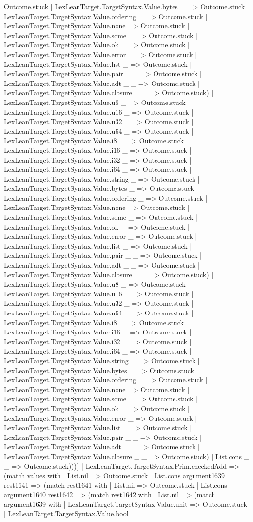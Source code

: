 \documentclass[11pt]{article}
\begin{document}
Outcome.stuck | LexLeanTarget.TargetSyntax.Value.bytes \_ => Outcome.stuck | LexLeanTarget.TargetSyntax.Value.ordering \_ => Outcome.stuck | LexLeanTarget.TargetSyntax.Value.none => Outcome.stuck | LexLeanTarget.TargetSyntax.Value.some \_ => Outcome.stuck | LexLeanTarget.TargetSyntax.Value.ok \_ => Outcome.stuck | LexLeanTarget.TargetSyntax.Value.error \_ => Outcome.stuck | LexLeanTarget.TargetSyntax.Value.list \_ => Outcome.stuck | LexLeanTarget.TargetSyntax.Value.pair \_ \_ => Outcome.stuck | LexLeanTarget.TargetSyntax.Value.adt \_ \_ => Outcome.stuck | LexLeanTarget.TargetSyntax.Value.closure \_ \_ => Outcome.stuck) | LexLeanTarget.TargetSyntax.Value.u8 \_ => Outcome.stuck | LexLeanTarget.TargetSyntax.Value.u16 \_ => Outcome.stuck | LexLeanTarget.TargetSyntax.Value.u32 \_ => Outcome.stuck | LexLeanTarget.TargetSyntax.Value.u64 \_ => Outcome.stuck | LexLeanTarget.TargetSyntax.Value.i8 \_ => Outcome.stuck | LexLeanTarget.TargetSyntax.Value.i16 \_ => Outcome.stuck | LexLeanTarget.TargetSyntax.Value.i32 \_ => Outcome.stuck | LexLeanTarget.TargetSyntax.Value.i64 \_ => Outcome.stuck | LexLeanTarget.TargetSyntax.Value.string \_ => Outcome.stuck | LexLeanTarget.TargetSyntax.Value.bytes \_ => Outcome.stuck | LexLeanTarget.TargetSyntax.Value.ordering \_ => Outcome.stuck | LexLeanTarget.TargetSyntax.Value.none => Outcome.stuck | LexLeanTarget.TargetSyntax.Value.some \_ => Outcome.stuck | LexLeanTarget.TargetSyntax.Value.ok \_ => Outcome.stuck | LexLeanTarget.TargetSyntax.Value.error \_ => Outcome.stuck | LexLeanTarget.TargetSyntax.Value.list \_ => Outcome.stuck | LexLeanTarget.TargetSyntax.Value.pair \_ \_ => Outcome.stuck | LexLeanTarget.TargetSyntax.Value.adt \_ \_ => Outcome.stuck | LexLeanTarget.TargetSyntax.Value.closure \_ \_ => Outcome.stuck) | LexLeanTarget.TargetSyntax.Value.u8 \_ => Outcome.stuck | LexLeanTarget.TargetSyntax.Value.u16 \_ => Outcome.stuck | LexLeanTarget.TargetSyntax.Value.u32 \_ => Outcome.stuck | LexLeanTarget.TargetSyntax.Value.u64 \_ => Outcome.stuck | LexLeanTarget.TargetSyntax.Value.i8 \_ => Outcome.stuck | LexLeanTarget.TargetSyntax.Value.i16 \_ => Outcome.stuck | LexLeanTarget.TargetSyntax.Value.i32 \_ => Outcome.stuck | LexLeanTarget.TargetSyntax.Value.i64 \_ => Outcome.stuck | LexLeanTarget.TargetSyntax.Value.string \_ => Outcome.stuck | LexLeanTarget.TargetSyntax.Value.bytes \_ => Outcome.stuck | LexLeanTarget.TargetSyntax.Value.ordering \_ => Outcome.stuck | LexLeanTarget.TargetSyntax.Value.none => Outcome.stuck | LexLeanTarget.TargetSyntax.Value.some \_ => Outcome.stuck | LexLeanTarget.TargetSyntax.Value.ok \_ => Outcome.stuck | LexLeanTarget.TargetSyntax.Value.error \_ => Outcome.stuck | LexLeanTarget.TargetSyntax.Value.list \_ => Outcome.stuck | LexLeanTarget.TargetSyntax.Value.pair \_ \_ => Outcome.stuck | LexLeanTarget.TargetSyntax.Value.adt \_ \_ => Outcome.stuck | LexLeanTarget.TargetSyntax.Value.closure \_ \_ => Outcome.stuck) | List.cons \_ \_ => Outcome.stuck)))) | LexLeanTarget.TargetSyntax.Prim.checkedAdd => (match values with | List.nil => Outcome.stuck | List.cons argument1639 rest1641 => (match rest1641 with | List.nil => Outcome.stuck | List.cons argument1640 rest1642 => (match rest1642 with | List.nil => (match argument1639 with | LexLeanTarget.TargetSyntax.Value.unit => Outcome.stuck | LexLeanTarget.TargetSyntax.Value.bool \_ 
\end{document}

